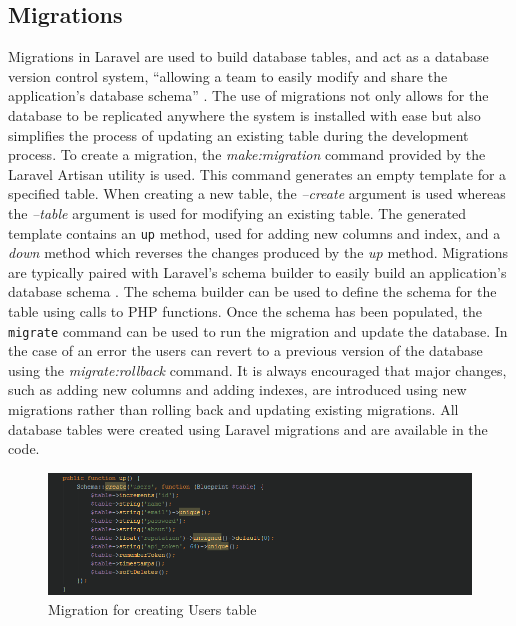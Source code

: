 \subsection{Migrations}
Migrations in Laravel are used to build database tables, and act as a database version control system, ``allowing a team to easily modify and share the application's database schema'' \cite{Laravel:Migrations}. The use of migrations not only allows for the database to be replicated anywhere the system is installed with ease but also simplifies the process of updating an existing table during the development process.  To create a migration, the \emph{make:migration} command provided by the Laravel Artisan utility is used. This command generates an empty template for a specified table. When creating a new table, the \emph{--create} argument is used whereas the \emph{--table} argument is used for modifying an existing table. The generated template contains an \texttt{up} method, used for adding new columns and index, and a \emph{down} method which reverses the changes produced by the \emph{up} method. Migrations are typically paired with Laravel's schema builder to easily build an application's database schema \cite{Laravel:Migrations}. The schema builder can be used to define the schema for the table using calls to PHP functions. Once the schema has been populated, the \texttt{migrate} command can be used to run the migration and update the database. In the case of an error the users can revert to a previous version of the database using the \emph{migrate:rollback} command. It is always encouraged that major changes, such as adding new columns and adding indexes, are introduced using new migrations rather than rolling back and updating existing migrations. All database tables were created using Laravel migrations and are available in the code.

\begin{figure}[H]
    \centering
    \includegraphics[width=\textwidth]{Images/Implementation/UserMigration}
    \caption{Migration for creating Users table} \label{fig:UserMigration}
\end{figure}

